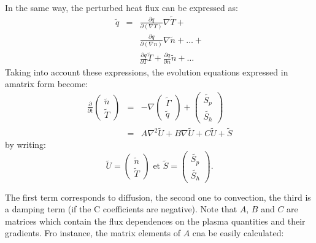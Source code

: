 In the same way, the perturbed heat flux can be expressed as:
\begin{eqnarray}
	\tilde{q} & = & \frac{\partial q}{\partial \left( \nabla T \right)}\nabla \tilde{T} + \nonumber	\\
								&		& \frac{\partial q}{\partial \left( \nabla n \right)}\nabla \tilde{n} + 
													\ldots  + \nonumber	\\
								&		& \frac{\partial q}{\partial T}\tilde{T} + \frac{\partial q}{\partial n}\tilde{n}
													+ \ldots
\end{eqnarray}
Taking into account these expressions, the evolution equations expressed in amatrix form become:
\begin{eqnarray}
	\frac{\partial}{\partial t} \left( \begin{array}{cc}
																				\tilde{n}	\\		
																				\tilde{T}
																		 \end{array}
															\right)
																			& = &	-\nabla \left(
																												\begin{array}{cc}
																														\tilde{\Gamma} \\
																														\tilde{q}
																												\end{array}
																										\right)
																						+ \left(
																									\begin{array}{cc}
																											\tilde{S_p}	\\
																											\tilde{S_h}
																									\end{array}
																							\right)				\nonumber		\\
																			& = & A \nabla^2 \tilde{U} + B \nabla \tilde{U} + C\tilde{U} + \tilde{S}
\end{eqnarray}
by writing: 
\[
\tilde{U} = \left( \begin{array}{cc} 
							\tilde{n} \\ 
							\tilde{T}  
					 \end{array} 
		\right) \mbox{ et } 
\tilde{S} = \left( \begin{array}{cc}
							\tilde{S_p} \\ 
							\tilde{S_h} 
					 \end{array} 
		\right)\mbox{.}
\] 

The first term corresponds to diffusion, the second one to convection, the third is a damping term (if the C coefficients are negative). Note that $A$, $B$ and $C$ are matrices which contain the flux dependences on the plasma quantities and their gradients. Fro instance, the matrix elements of $A$ cna be easily calculated:

